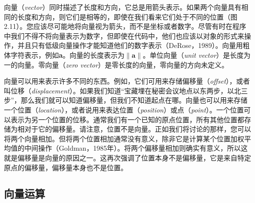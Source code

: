 \documentclass[lang=cn,12pt,marginpar=margintrue]{elegantbook}
\begin{document}

向量（\textit{vector}）同时描述了长度和方向，它总是用箭头表示。如果两个向量具有相同的长度和方向，则它们是相等的，即使在我们看来它们处于不同的位置（图 2.11）。您应该尽可能地将向量视为箭头，而不是坐标或者数字。尽管有时在程序中我们不得不将向量表示为数字，但即使在代码中，他们也应该以对象的形式来操作，并且只有低级向量操作才能知道他们的数字表示（DeRose，1989）。向量用粗体字符表示，例如\textbf{a}。向量的长度表示为$\|\mathbf{a}\|$。单位向量（\textit{unit vector}）是长度为一的向量。零向量（\textit{zero vector}）是零长度的向量，零向量的方向未定义。

向量可以用来表示许多不同的东西。例如，它们可用来存储偏移量（\textit{offset}），或者叫位移（\textit{displacement}）。如果我们知道“宝藏埋在秘密会议地点以东两步，以北三步”，那么我们就可以知道偏移量，但我们不知道起点在哪。向量也可以用来存储一个位置（\textit{location}），或者说用来表达位置（\textit{position}）或点（\textit{point}）。一个位置可以表示为另一个位置的位移。通常我们有一个已知的原点位置，所有其他位置都存储为相对于它的偏移量。请注意，位置不是向量。正如我们将讨论的那样，您可以将两个向量相加。但将两个位置相加通常没有意义，除非它是计算某个位置加权平均值的中间操作（Goldman，1985年）。将两个偏移量相加则确实有意义，所以这就是偏移量是向量的原因之一。这再次强调了位置本身不是偏移量，它是来自特定原点的偏移量，偏移量本身也不是位置。

\subsection{向量运算}
\end{document}
